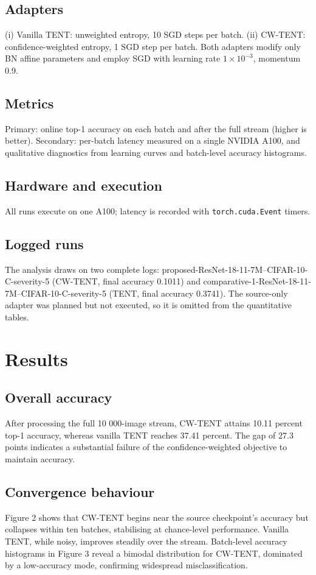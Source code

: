 \documentclass{article} %
\begin{document}
\subsection{Adapters}
(i) Vanilla TENT: unweighted entropy, 10 SGD steps per batch. (ii) CW-TENT: confidence-weighted entropy, 1 SGD step per batch. Both adapters modify only BN affine parameters and employ SGD with learning rate \(1 \times 10^{-3}\), momentum 0.9.

\subsection{Metrics}
Primary: online top-1 accuracy on each batch and after the full stream (higher is better). Secondary: per-batch latency measured on a single NVIDIA A100, and qualitative diagnostics from learning curves and batch-level accuracy histograms.

\subsection{Hardware and execution}
All runs execute on one A100; latency is recorded with \texttt{torch.cuda.Event} timers.

\subsection{Logged runs}
The analysis draws on two complete logs: proposed-ResNet-18-11-7M--CIFAR-10-C-severity-5 (CW-TENT, final accuracy 0.1011) and comparative-1-ResNet-18-11-7M--CIFAR-10-C-severity-5 (TENT, final accuracy 0.3741). The source-only adapter was planned but not executed, so it is omitted from the quantitative tables.

\section{Results}
\label{sec:results}
\subsection{Overall accuracy}
After processing the full 10 000-image stream, CW-TENT attains 10.11 percent top-1 accuracy, whereas vanilla TENT reaches 37.41 percent. The gap of 27.3 points indicates a substantial failure of the confidence-weighted objective to maintain accuracy.

\subsection{Convergence behaviour}
Figure 2 shows that CW-TENT begins near the source checkpoint’s accuracy but collapses within ten batches, stabilising at chance-level performance. Vanilla TENT, while noisy, improves steadily over the stream. Batch-level accuracy histograms in Figure 3 reveal a bimodal distribution for CW-TENT, dominated by a low-accuracy mode, confirming widespread misclassification.
\end{document}
